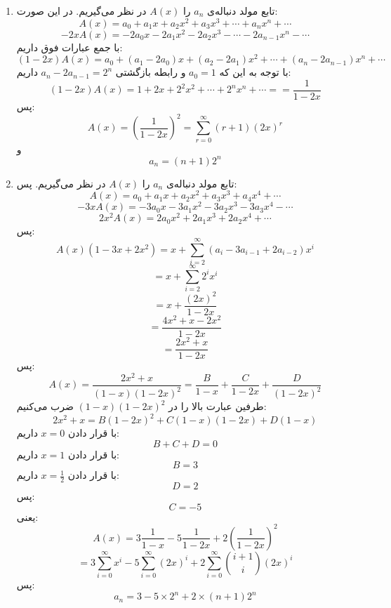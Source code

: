         \p
\begin{enumerate}
\item
تابع مولد دنباله‌ی
$a_n$
را
$A(x)$
در نظر می‌گیریم. در این صورت:
$$A(x) = a_0 + a_1x + a_2x^2 + a_3x^3 + \cdots + a_nx^n + \cdots$$
$$-2xA(x) = -2a_0x - 2a_1x^2 - 2a_2x^3 - \cdots -2a_{n-1}x^n - \cdots$$
با جمع عبارات فوق داریم:
$$(1-2x)A(x) = a_0 + (a_1 - 2a_0)x + (a_2 - 2a_1)x^2 + \cdots + (a_n - 2a_{n-1})x^n + \cdots$$
با توجه به این که
$a_0 = 1$
و رابطه بازگشتی
$a_n -2a_{n-1} = 2^n$
داریم:
$$(1-2x)A(x) = 1 + 2x + 2^2x^2 + \cdots + 2^nx^n + \cdots = = \frac{1}{1 - 2x}$$
پس:
$$A(x) = (\frac{1}{1-2x})^2 = \sum_{r=0}^{\infty}(r+1)(2x)^r$$
و
$$a_n = (n+1)2^n$$
\item
تابع مولد دنباله‌ی
$a_n$
را
$A(x)$
در نظر می‌گیریم. پس:
$$A(x) = a_0 + a_1x + a_2x^2 + a_3x^3 + a_4x^4 + \cdots$$
$$-3xA(x) = -3a_0x - 3a_1x^2 - 3a_2x^3 - 3a_3x^4 - \cdots$$
$$2x^2 A(x) = 2a_0x^2 + 2a_1x^3 + 2a_2x^4 + \cdots$$
پس:
$$A(x)(1-3x+2x^2) = x + \sum_{i=2}^{\infty}(a_i-3a_{i-1}+2a_{i-2})x^i$$
$$= x + \sum_{i=2}^{\infty}2^ix^i$$
$$= x + \frac{(2x)^2}{1-2x}$$
$$= \frac{4x^2+x-2x^2}{1-2x}$$
$$= \frac{2x^2+x}{1-2x}$$
پس:
$$A(x)= \frac{2x^2+x}{(1-x)(1-2x)^2} = \frac{B}{1-x} + \frac{C}{1-2x} + \frac{D}{(1-2x)^2}$$
طرفین عبارت بالا را در
$(1-x)(1-2x)^2$
ضرب می‌کنیم:
$$2x^2 + x = B(1-2x)^2 + C(1-x)(1-2x) + D(1-x)$$
با قرار دادن
$x = 0$
داریم:
$$B + C + D = 0$$
با قرار دادن
$x = 1$
داریم:
$$B = 3$$
با قرار دادن
$x = \frac{1}{2}$
داریم:
$$D = 2$$
پس:
$$C = -5$$
یعنی:
$$A(x) = 3\frac{1}{1-x} - 5\frac{1}{1-2x} + 2(\frac{1}{1-2x})^2$$
$$= 3\sum_{i=0}^{\infty}x^i - 5\sum_{i=0}^{\infty}(2x)^i + 2\sum_{i=0}^{\infty}\binom{i+1}{i}(2x)^i$$
پس:
$$a_n = 3 - 5 \times 2^n + 2 \times (n + 1)2^n$$
\end{enumerate}